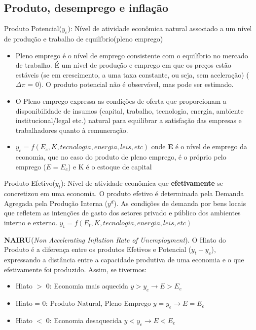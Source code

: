 \documentclass[a4paper,12pt]{article}[abntex2]
\begin{document}
\subsection{\textbf{Produto, desemprego e inflação}}

Produto Potencial($y_e$): Nível de atividade econômica natural associado a um nível de produção e trabalho de equilíbrio(pleno emprego)\begin{itemize}
    \item Pleno emprego é o nível de emprego consistente com o equilíbrio no mercado de trabalho. É um nível de produção e emprego em que os preços estão estáveis (se em crescimento, a uma taxa constante, ou seja, sem aceleração) ($\Delta \pi$ = 0). O produto potencial não é observável, mas pode ser estimado.
    \item O Pleno emprego expressa as condições de oferta que proporcionam a disponibilidade de insumos (capital, trabalho, tecnologia, energia, ambiente institucional/legal etc.) natural  para  equilibrar  a  satisfação  das  empresas  e  trabalhadores  quanto  à remuneração. 
    \item $y_e=f(E_e, K, tecnologia,energia,leis,etc)$ onde \textbf{E} é o nível de emprego da economia, que no caso do produto de pleno emprego, é o próprio pelo emprego ($E=E_e$) e K é o estoque de capital
\end{itemize}

Produto Efetivo($y_t$): Nível de atividade econômica que \textbf{efetivamente} se concretizou em uma economia. O produto efetivo é determinada pela Demanda Agregada pela Produção Interna ($y^d$). As condições de demanda por bens locais que refletem as intenções de gasto dos setores privado e público dos ambientes interno e externo. $y_t=f(E_t, K, tecnologia,energia,leis,etc)$

\textbf{NAIRU}(\textit{Non Accelerating Inflation Rate of Unemployment}). O Hiato do Produto é a diferença entre os produtos Efetivos e Potencial ($y_t - y_e$), expressando a distância entre a capacidade produtiva de uma economia e o que efetivamente foi produzido. Assim, se tivermos: \begin{itemize}
    \item Hiato $>$ 0: Economia mais aquecida $y>y_e \rightarrow E>E_e$
    \item Hiato = 0: Produto Natural, Pleno Emprego $y=y_e \rightarrow E=E_e$
    \item Hiato $<$ 0: Economia desaquecida $y<y_e \rightarrow E<E_e$
\end{itemize}
\end{document}
